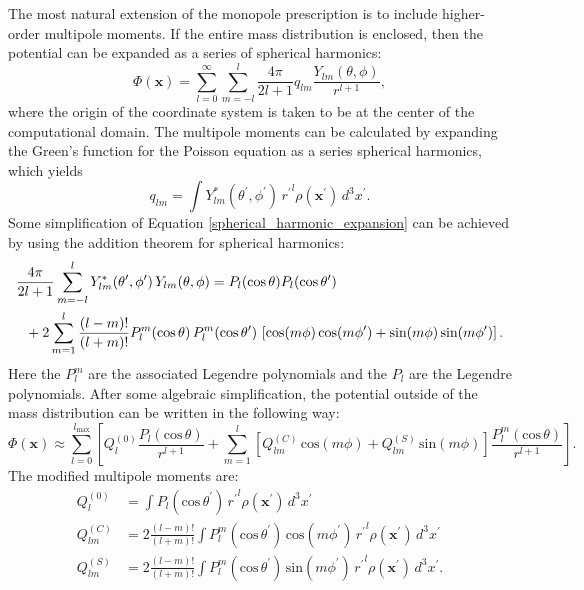 \documentclass[12pt,preprint]{aastex}
\begin{document}
The most natural extension of the monopole prescription is to include higher-order multipole moments. If the entire mass distribution is enclosed, then the potential can be expanded as a series of spherical harmonics:
\begin{equation}
  \Phi(\mathbf{x}) = \sum_{l=0}^{\infty}\sum_{m=-l}^{l} \frac{4\pi}{2l + 1} q_{lm} \frac{Y_{lm}(\theta,\phi)}{r^{l+1}}, \label{spherical_harmonic_expansion}
\end{equation}
where the origin of the coordinate system is taken to be at the center of the computational domain. The multipole moments can be calculated by expanding the Green's function for the Poisson equation as a series spherical harmonics, which yields
\begin{equation}
  q_{lm} = \int Y^*_{lm}(\theta^\prime, \phi^\prime)\, {r^\prime}^l \rho(\mathbf{x}^\prime)\, d^3x^\prime. \label{multipole_moments_original}
\end{equation}
Some simplification of Equation \ref{spherical_harmonic_expansion} can be achieved by using the addition theorem for spherical harmonics:
\begin{align}
  &\frac{4\pi}{2l+1} \sum_{m=-l}^{l} Y^*_{lm}(\theta^\prime,\phi^\prime)\, Y_{lm}(\theta, \phi) = P_l(\text{cos}\, \theta) P_l(\text{cos}\, \theta^\prime) \notag \\
  &\ \ + 2 \sum_{m=1}^{l} \frac{(l-m)!}{(l+m)!} P_{l}^{m}(\text{cos}\, \theta)\, P_{l}^{m}(\text{cos}\, \theta^\prime)\, \left[\text{cos}(m\phi)\, \text{cos}(m\phi^\prime) + \text{sin}(m\phi)\, \text{sin}(m\phi^\prime)\right].
\end{align}
Here the $P_{l}^{m}$ are the associated Legendre polynomials and the $P_l$ are the Legendre polynomials. After some algebraic simplification, the potential outside of the mass distribution can be written in the following way:
\begin{equation}
  \Phi(\mathbf{x}) \approx \sum_{l=0}^{l_{\text{max}}} \left[Q_l^{(0)} \frac{P_l(\text{cos}\, \theta)}{r^{l+1}} + \sum_{m = 1}^{l}\left[ Q_{lm}^{(C)}\, \text{cos}(m\phi) + Q_{lm}^{(S)}\, \text{sin}(m\phi)\right] \frac{P_{l}^{m}(\text{cos}\, \theta)}{r^{l+1}} \right].
\end{equation}
The modified multipole moments are:
\begin{align}
  Q_l^{(0)}   &= \int P_l(\text{cos}\, \theta^\prime)\, {r^{\prime}}^l \rho(\mathbf{x}^\prime)\, d^3 x^\prime \\
  Q_{lm}^{(C)} &= 2\frac{(l-m)!}{(l+m)!} \int P_{l}^{m}(\text{cos}\, \theta^\prime)\, \text{cos}(m\phi^\prime)\, {r^\prime}^l \rho(\mathbf{x}^\prime)\, d^3 x^\prime \\
  Q_{lm}^{(S)} &= 2\frac{(l-m)!}{(l+m)!} \int P_{l}^{m}(\text{cos}\, \theta^\prime)\, \text{sin}(m\phi^\prime)\, {r^\prime}^l \rho(\mathbf{x}^\prime)\, d^3 x^\prime.
\end{align}
\end{document}
